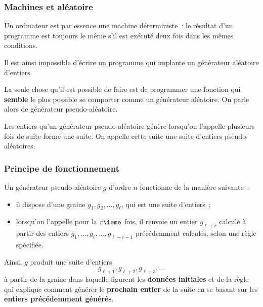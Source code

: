 \begin{frame}[fragile]\frametitle{Machines et aléatoire}
Un ordinateur est par essence une \alert{machine déterministe}~: le
résultat d'un programme est toujours le même s'il est exécuté deux fois
dans les mêmes conditions.
\bigskip

Il est ainsi impossible d'écrire un programme qui implante un générateur
aléatoire d'entiers.
\bigskip

La seule chose qu'il est possible de faire est de programmer une fonction
qui {\bf semble} le plus possible se comporter comme un générateur aléatoire.
On parle alors de \alert{générateur pseudo-aléatoire}.
\bigskip

Les entiers qu'un générateur pseudo-aléatoire génère lorsqu'on l'appelle
plusieurs fois de suite forme une suite. On appelle cette suite une
suite d'\alert{entiers pseudo-aléatoires}.
\end{frame}

\begin{frame}[fragile]\frametitle{Principe de fonctionnement}
Un générateur pseudo-aléatoire $g$ d'ordre $n$ fonctionne de la
manière suivante~:
\smallskip

\begin{itemize}
    \item il dispose d'une \alert{graine} $g_1, g_2, \dots, g_\ell$,
    qui est une suite d'entiers~;
    \smallskip

    \item lorsqu'on l'appelle pour la $r\ieme$ fois, il renvoie un
    entier $g_{\ell + r}$ calculé à partir des entiers
    $g_1, \dots, g_\ell, \dots, g_{\ell + r - 1}$ précédemment calculés,
    selon une \alert{règle} spécifiée.
\end{itemize}
\medskip

Ainsi, $g$ produit une suite d'entiers
\begin{equation*}
    g_{\ell + 1}, g_{\ell + 2}, g_{\ell + 3}, \dots
\end{equation*}
à partir de la graine dans laquelle figurent les {\bf données initiales}
et de la règle qui explique comment générer le {\bf prochain entier} de
la suite en se basant sur les {\bf entiers précédemment générés}.
\end{frame}


